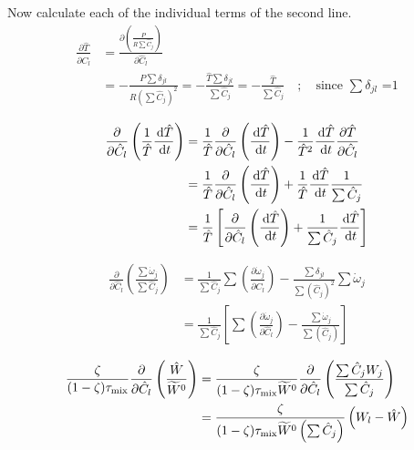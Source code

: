 Now calculate each of the individual terms of the second line.
\begin{align}\label{eq:dTempByDConc}
\frac{\partial \hat{T}}{\partial \hat{C}_{l}} &= \frac{\partial \left(\frac{P}{R \sum{\hat{C}_j}} \right) }{\partial \hat{C}_{l}} \\
&= -\frac{P\sum{\delta_{jl}}}{R \left(\sum{\hat{C}_j}\right)^2}
= - \frac{\hat{T}\sum{\delta_{jl}}}{\sum{\hat{C}_j}}
= - \frac{\hat{T}}{\sum{\hat{C}_j}} \quad ; \quad \text{since $\sum{\delta_{jl}}$ =1}
\end{align}

\begin{align}\label{eq:JacCCC_1}
\frac{\partial}{\partial \hat{C}_{l}} \left( \frac{1}{\hat{T}} \frac{\,\mathrm{d} \hat{T}}{\,\mathrm{d} t} \right)&= \frac{1}{\hat{T}} \frac{\partial}{\partial \hat{C}_{l}} \left( \frac{\,\mathrm{d} \hat{T}}{\,\mathrm{d} t} \right) - \frac{1}{\hat{T}^2} \frac{\,\mathrm{d} \hat{T}}{\,\mathrm{d} t} \frac{\partial \hat{T}}{\partial \hat{C}_{l}} \\
&= \frac{1}{\hat{T}} \frac{\partial}{\partial \hat{C}_{l}} \left( \frac{\,\mathrm{d} \hat{T}}{\,\mathrm{d} t} \right) + \frac{1}{\hat{T}} \frac{\,\mathrm{d} \hat{T}}{\,\mathrm{d} t} \frac{1}{\sum{\hat{C}_j}} \\
&=\frac{1}{\hat{T}} \left[ \frac{\partial}{\partial \hat{C}_{l}} \left( \frac{\,\mathrm{d} \hat{T}}{\,\mathrm{d} t} \right) + \frac{1}{\sum{\hat{C}_j}} \frac{\,\mathrm{d} \hat{T}}{\,\mathrm{d} t} \right]
\end{align}

\begin{align}\label{eq:JacCCC_2}
\frac{\partial}{\partial \hat{C}_{l}} \left( \frac{\sum{\dot{\omega}_j}}{\sum{\hat{C}_j}}\right) &= \frac{1}{\sum{\hat{C}_j}} \sum{\left(\frac{\partial \dot{\omega}_j}{\partial \hat{C}_{l}} \right)} - \frac{\sum{\delta_{jl}}}{\sum{(\hat{C}_j)}^2} \sum{\dot{\omega}_j} \\
&= \frac{1}{\sum{\hat{C}_j}} \left[ \sum{\left(\frac{\partial \dot{\omega}_j}{\partial \hat{C}_{l}} \right)} - \frac{\sum{\dot{\omega}_j}}{\sum{(\hat{C}_j)}}  \right]
\end{align}


\begin{align}\label{eq:JacCCC_3}
\frac{\zeta}{(1-\zeta)\tau_{\rm mix}} \frac{\partial}{\partial \hat{C}_{l}} \left( \frac{\hat{W}}{\widetilde{W}^0} \right) &= \frac{\zeta}{(1-\zeta)\tau_{\rm mix} \widetilde{W}^0} \frac{\partial}{\partial \hat{C}_{l}} \left( \frac{\sum{\hat{C}_j W_j}}{\sum{\hat{C}_j}} \right) \\
&=\frac{\zeta}{(1-\zeta)\tau_{\rm mix} \widetilde{W}^0 \left(\sum{\hat{C}_j} \right)} \left(W_l-\hat{W} \right)
\end{align}



